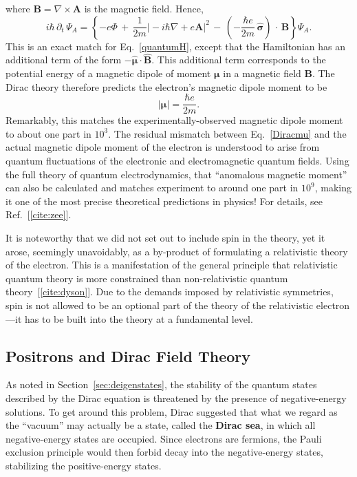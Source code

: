 \documentclass[prx,12pt]{revtex4-2}
\begin{document}
where $\mathbf{B} = \nabla\times\mathbf{A}$ is the magnetic field.
Hence,
\begin{equation}
  i\hbar\, \partial_t \, \Psi_A
  = \left\{-e\Phi
  \,+\, \frac{1}{2m} \big|-i\hbar\nabla +e\mathbf{A} \big|^2
  \,-\, \left(-\frac{\hbar e}{2m}\, \hat{\boldsymbol{\sigma}}\right)
  \,\cdot\, \mathbf{B} \right\} \Psi_A.
\end{equation}
This is an exact match for Eq.~\eqref{quantumH}, except that the
Hamiltonian has an additional term of the form $-
\hat{\boldsymbol{\mu}} \cdot \hat{\mathbf{B}}$.  This additional term
corresponds to the potential energy of a magnetic dipole of moment
$\boldsymbol{\mu}$ in a magnetic field $\mathbf{B}$.  The Dirac theory
therefore predicts the electron's magnetic dipole moment to be
\begin{equation}
  |\boldsymbol{\mu}| = \frac{\hbar e}{2m}.
  \label{Diracmu}
\end{equation}
Remarkably, this matches the experimentally-observed magnetic dipole
moment to about one part in $10^3$.  The residual mismatch between
Eq.~\eqref{Diracmu} and the actual magnetic dipole moment of the
electron is understood to arise from quantum fluctuations of the
electronic and electromagnetic quantum fields.  Using the full theory
of quantum electrodynamics, that ``anomalous magnetic moment'' can
also be calculated and matches experiment to around one part in
$10^9$, making it one of the most precise theoretical predictions in
physics!  For details, see Ref.~[\ref{cite:zee}].

It is noteworthy that we did not set out to include spin in the
theory, yet it arose, seemingly unavoidably, as a by-product of
formulating a relativistic theory of the electron.  This is a
manifestation of the general principle that relativistic quantum
theory is more constrained than non-relativistic quantum
theory~[\ref{cite:dyson}].  Due to the demands imposed by relativistic
symmetries, spin is not allowed to be an optional part of the theory
of the relativistic electron---it has to be built into the theory at a
fundamental level.

\subsection{Positrons and Dirac Field Theory}
\label{sec:positrons}

As noted in Section~\ref{sec:deigenstates}, the stability of the
quantum states described by the Dirac equation is threatened by the
presence of negative-energy solutions.  To get around this problem,
Dirac suggested that what we regard as the ``vacuum'' may actually be
a state, called the \textbf{Dirac sea}, in which all negative-energy
states are occupied.  Since electrons are fermions, the Pauli
exclusion principle would then forbid decay into the negative-energy
states, stabilizing the positive-energy states.
\end{document}
